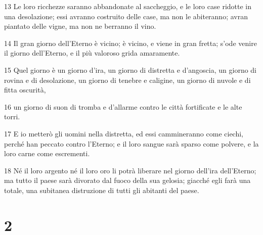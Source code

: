 \par 13 Le loro ricchezze saranno abbandonate al saccheggio, e le loro case ridotte in una desolazione; essi avranno costruito delle case, ma non le abiteranno; avran piantato delle vigne, ma non ne berranno il vino.
\par 14 Il gran giorno dell'Eterno è vicino; è vicino, e viene in gran fretta; s'ode venire il giorno dell'Eterno, e il più valoroso grida amaramente.
\par 15 Quel giorno è un giorno d'ira, un giorno di distretta e d'angoscia, un giorno di rovina e di desolazione, un giorno di tenebre e caligine, un giorno di nuvole e di fitta oscurità,
\par 16 un giorno di suon di tromba e d'allarme contro le città fortificate e le alte torri.
\par 17 E io metterò gli uomini nella distretta, ed essi cammineranno come ciechi, perché han peccato contro l'Eterno; e il loro sangue sarà sparso come polvere, e la loro carne come escrementi.
\par 18 Né il loro argento né il loro oro li potrà liberare nel giorno dell'ira dell'Eterno; ma tutto il paese sarà divorato dal fuoco della sua gelosia; giacché egli farà una totale, una subitanea distruzione di tutti gli abitanti del paese.

\chapter{2}

